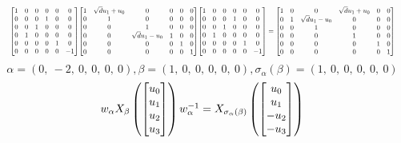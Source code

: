 \documentclass[11pt]{article}
\theoremstyle{definition}
\begin{document}
\[
\scaletoalign{\textwidth}{{\left[\begin{matrix}1 & 0 & 0 & 0 & 0 & 0\\0 & 0 & 0 & 1 & 0 & 0\\0 & 0 & 1 & 0 & 0 & 0\\0 & 1 & 0 & 0 & 0 & 0\\0 & 0 & 0 & 0 & 1 & 0\\0 & 0 & 0 & 0 & 0 & -1\end{matrix}\right]} {\left[\begin{matrix}1 & \sqrt{d} u_{1} + u_{0} & 0 & 0 & 0 & 0\\0 & 1 & 0 & 0 & 0 & 0\\0 & 0 & 1 & 0 & 0 & 0\\0 & 0 & \sqrt{d} u_{1} - u_{0} & 1 & 0 & 0\\0 & 0 & 0 & 0 & 1 & 0\\0 & 0 & 0 & 0 & 0 & 1\end{matrix}\right]} {\left[\begin{matrix}1 & 0 & 0 & 0 & 0 & 0\\0 & 0 & 0 & 1 & 0 & 0\\0 & 0 & 1 & 0 & 0 & 0\\0 & 1 & 0 & 0 & 0 & 0\\0 & 0 & 0 & 0 & 1 & 0\\0 & 0 & 0 & 0 & 0 & -1\end{matrix}\right]} = {\left[\begin{matrix}1 & 0 & 0 & \sqrt{d} u_{1} + u_{0} & 0 & 0\\0 & 1 & \sqrt{d} u_{1} - u_{0} & 0 & 0 & 0\\0 & 0 & 1 & 0 & 0 & 0\\0 & 0 & 0 & 1 & 0 & 0\\0 & 0 & 0 & 0 & 1 & 0\\0 & 0 & 0 & 0 & 0 & 1\end{matrix}\right]}}
\]
\[
\alpha = \left( 0, \  -2, \  0, \  0, \  0, \  0\right), \beta = \left( 1, \  0, \  0, \  0, \  0, \  0\right), \sigma_{\alpha}(\beta) = \left( 1, \  0, \  0, \  0, \  0, \  0\right)
\]
\[
\scaletoalign{\textwidth}{w_{\alpha} X_{\beta}\left(\left[\begin{matrix}u_{0}\\u_{1}\\u_{2}\\u_{3}\end{matrix}\right]\right) w_{\alpha}^{-1} = X_{\sigma_{\alpha}\left(\beta\right)}\left(\left[\begin{matrix}u_{0}\\u_{1}\\- u_{2}\\- u_{3}\end{matrix}\right]\right)}
\]
\end{document}
